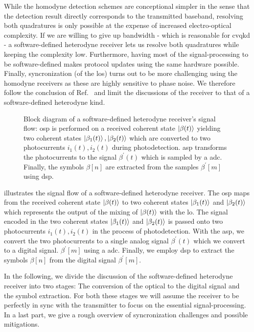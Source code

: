 While the homodyne detection schemes are conceptional simpler in the sense that the detection result directly corresponds to the transmitted baseband, resolving both quadratures is only possible at the expense of increased electro-optical complexity.
If we are willing to give up bandwidth - which is reasonable for \gls{cvqkd} - a software-defined heterodyne receiver lets us resolve both quadratures while keeping the complexity low.
Furthermore, having most of the signal-processing to be software-defined makes protocol updates using the same hardware possible.
Finally, syncronization (of the \gls{lo}s) turns out to be more challenging using the homodyne receivers as these are highly sensitive to phase noise.
We therefore follow the conclusion of Ref.~\cite{Brunner2017} and limit the discussions of the receiver to that of a software-defined heterodyne kind.
\begin{figure}[htb]
	\centering
	
	\caption{Block diagram of a software-defined heterodyne receiver's signal flow: \gls{osp} is performed on a received coherent state $\ket{\beta(t)}$ yielding two coherent states $\ket{\beta_1(t)},\ket{\beta_2(t)}$ which are converted to two photocurrents $i_1(t),i_2(t)$ during photodetection. \gls{asp} transforms the photocurrents to the signal $\beta^\prime(t)$ which is sampled by a \gls{adc}. Finally, the symbols $\beta[n]$ are extracted from the samples $\beta^\prime[m]$ using \gls{dsp}.}\label{fig:receiver_signal_flow}
\end{figure}
 illustrates the signal flow of a software-defined heterodyne receiver.
The \gls{osp} maps from the received coherent state $\ket{\beta(t)}$ to two coherent states $\ket{\beta_1(t)}$ and $\ket{\beta_2(t)}$ which represents the output of the mixing of $\ket{\beta(t)}$ with the \gls{lo}.
The signal encoded in the two coherent states $\ket{\beta_1(t)}$ and $\ket{\beta_2(t)}$ is passed onto two photocurrents $i_1(t),i_2(t)$ in the process of photodetection.
With the \gls{asp}, we convert the two photocurrents to a single analog signal $\beta^\prime(t)$ which we convert to a digital signal. $\beta^\prime[m]$ using a \gls{adc}.
Finally, we employ \gls{dsp} to extract the symbols $\beta[n]$ from the digital signal $\beta^\prime[m]$.

In the following, we divide the discussion of the software-defined heterodyne receiver into two stages:
The conversion of the optical to the digital signal and the symbol extraction.
For both these stages we will assume the receiver to be perfectly in sync with the transmitter to focus on the essential signal-processing.
In a last part, we give a rough overview of syncronization challenges and possible mitigations.

